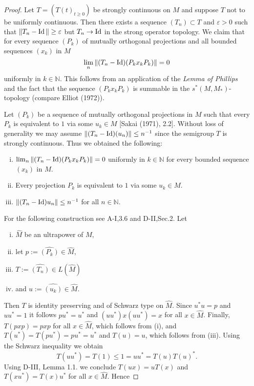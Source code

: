 \begin{proof}
Let $T = (T(t)_{t \geq 0})$ be strongly continuous on $M$ and suppose $T$ not to be uniformly continuous.
Then there exists a sequence $(T_n) \subset T$ and $\varepsilon > 0$ such that $\|T_n - \operatorname{Id}\| \geq \varepsilon$ but $T_n \to \operatorname{Id}$ in the strong operator topology.
We claim that for every sequence $(P_k)$ of mutually orthogonal projections and all bounded sequences $(x_k)$ in $M$
\[
\lim_n \|(T_n - \operatorname{Id})(P_k x_k P_k)\| = 0
\]
uniformly in $k \in \mathbb{N}$.
This follows from an application of the \emph{Lemma of Phillips} and the fact that the sequence $(P_{k} x_{k} P_{k})$ is summable in the $s^{*}(M,M_*)$-topology (compare Elliot (1972)).

Let $(P_k)$ be a sequence of mutually orthogonal projections in $M$ such that every $P_k$ is equivalent to $1$ via some $u_k \in M$ [Sakai (1971), 2.2].
Without loss of generality we may assume $\|(T_n - \operatorname{Id})(u_n)\| \leq n^{-1}$ since the semigroup $T$ is strongly continuous.
Thus we obtained the following:

\begin{enumerate}[(i)]
\item 
$\lim_n \|(T_n - \operatorname{Id})(P_k x_k P_k)\| = 0$ uniformly in $k \in \mathbb{N}$ for every bounded sequence $(x_k)$ in $M$.
\item 
Every projection $P_k$ is equivalent to $1$ via some $u_k \in M$.
\item 
$\|(T_n - \operatorname{Id})u_n\| \leq n^{-1}$ for all $n \in \mathbb{N}$.
\end{enumerate}

For the following construction see A-I,3.6 and D-II,Sec.2.
Let 

\begin{enumerate}[(i)]
\item
$\widehat{M}$ be an ultrapower of $M$,

\item
let $p := \widehat{(P_{k})} \in \widehat{M}$,

\item
$T := \widehat{(T_{n}) }\in L(\widehat{M})$

\item
 and $u := \widehat{(u_{k})}  \in \widehat{M}$.

\end{enumerate}
Then $T$ is identity preserving and of Schwarz type on $\widehat{M}$.
Since $u^*u = p$ and $uu^* = 1$ it follows $pu^* = u^*$ and $(uu^*)x(uu^*) = x$ for all $x \in \widehat{M}$.
Finally, $T(pxp) = pxp$ for all $x \in \widehat{M}$, which follows from (i), and $T(u^*) = T(pu^*) = pu^* = u^*$ and $T(u) = u$, which follows from (iii).
Using the Schwarz inequality we obtain
\[
T(uu^*) = T(1) \leq 1 = uu^* = T(u)T(u)^*.
\]
Using D-III, Lemma 1.1. we conclude $T(ux) = uT(x)$ and $T(xu^*) = T(x)u^*$ for all $x \in \widehat{M}$.
Hence


\end{proof}
